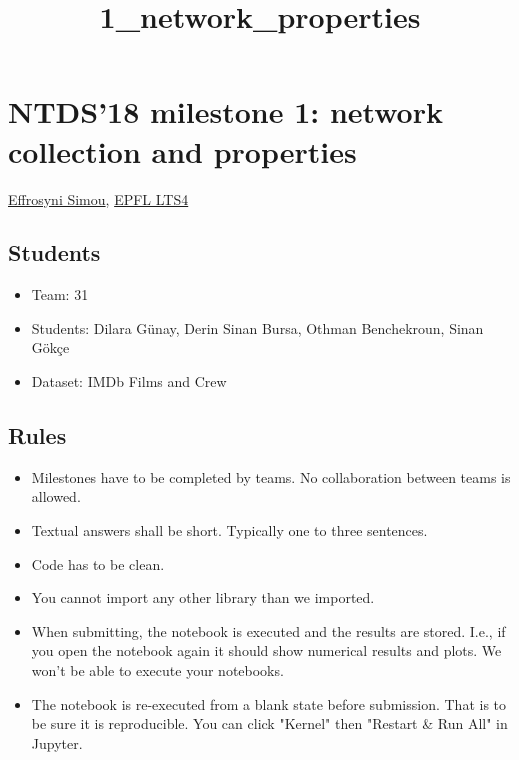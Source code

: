 \documentclass[11pt]{article}
\title{1\_network\_properties}
\providecommand{\tightlist}{%
      \setlength{\itemsep}{0pt}\setlength{\parskip}{0pt}}
\begin{document}
    
    
    \maketitle
    
    

    
    \section{NTDS'18 milestone 1: network collection and
properties}\label{ntds18-milestone-1-network-collection-and-properties}

\href{https://lts4.epfl.ch/simou}{Effrosyni Simou},
\href{https://lts4.epfl.ch}{EPFL LTS4}

    \subsection{Students}\label{students}

\begin{itemize}
\tightlist
\item
  Team: 31
\item
  Students: Dilara Günay, Derin Sinan Bursa, Othman Benchekroun, Sinan
  Gökçe
\item
  Dataset: IMDb Films and Crew
\end{itemize}

    \subsection{Rules}\label{rules}

\begin{itemize}
\tightlist
\item
  Milestones have to be completed by teams. No collaboration between
  teams is allowed.
\item
  Textual answers shall be short. Typically one to three sentences.
\item
  Code has to be clean.
\item
  You cannot import any other library than we imported.
\item
  When submitting, the notebook is executed and the results are stored.
  I.e., if you open the notebook again it should show numerical results
  and plots. We won't be able to execute your notebooks.
\item
  The notebook is re-executed from a blank state before submission. That
  is to be sure it is reproducible. You can click "Kernel" then "Restart
  \& Run All" in Jupyter.
\end{itemize}
\end{document}
